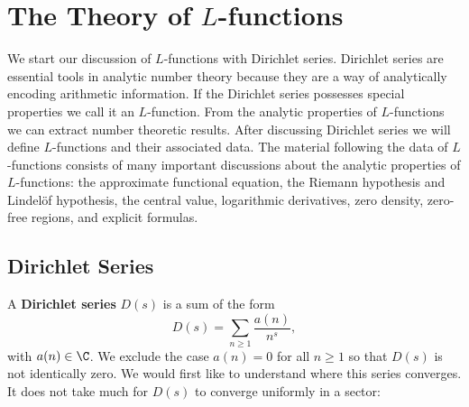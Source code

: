 \chapter{The Theory of \texorpdfstring{$L$}{L}-functions}
  We start our discussion of $L$-functions with Dirichlet series. Dirichlet series are essential tools in analytic number theory because they are a way of analytically encoding arithmetic information. If the Dirichlet series possesses special properties we call it an $L$-function. From the analytic properties of $L$-functions we can extract number theoretic results. After discussing Dirichlet series we will define $L$-functions and their associated data. The material following the data of $L$-functions consists of many important discussions about the analytic properties of $L$-functions: the approximate functional equation, the Riemann hypothesis and Lindel\"of hypothesis, the central value, logarithmic derivatives, zero density, zero-free regions, and explicit formulas.
  \section{Dirichlet Series}
    A \textbf{Dirichlet series} $D(s)$ is a sum of the form
    \[
      D(s) = \sum_{n \ge 1}\frac{a(n)}{n^{s}},
    \]
    with $a(n) \in \C$. We exclude the case $a(n) = 0$ for all $n \ge 1$ so that $D(s)$ is not identically zero. We would first like to understand where this series converges. It does not take much for $D(s)$ to converge uniformly in a sector:

